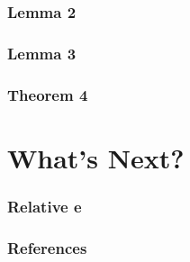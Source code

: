 \documentclass{beamer}
\begin{document}
\begin{frame}
\frametitle{Lemma 2}
\end{frame}

\begin{frame}
\frametitle{Lemma 3}
\end{frame}

\begin{frame}
\frametitle{Theorem 4}
\end{frame}

\section{What's Next?}

\begin{frame}
\frametitle{Relative e}
\end{frame}

\begin{frame}
\frametitle{References}
\end{frame}
\end{document}

